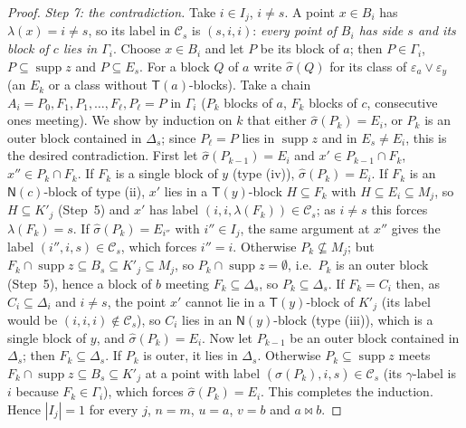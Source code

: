 \documentclass[11pt]{amsart}
\theoremstyle{definition}
\newcommand{\supp}{\operatorname{supp}}
\newcommand{\T}{\mathsf{T}}
\newcommand{\N}{\mathsf{N}}
\newcommand{\mt}{\bowtie}   %
\begin{document}
\begin{proof}
\smallskip\emph{Step 7: the contradiction.} Take $i\in I_j$, $i\ne s$. A point $x\in B_i$ has $\lambda(x)=i\ne s$, so its label in $\mathcal C_s$ is $(s,i,i)$: \emph{every point of $B_i$ has side $s$ and its block of $c$ lies in $\Gamma_i$}. Choose $x\in B_i$ and let $P$ be its block of $a$; then $P\in\Gamma_i$, $P\subseteq\supp z$ and $P\subseteq E_s$. For a block $Q$ of $a$ write $\hat\sigma(Q)$ for its class of $\varepsilon_a\vee\varepsilon_y$ (an $E_k$ or a class without $\T(a)$-blocks). Take a chain $A_i=P_0,F_1,P_1,\dots,F_\ell,P_\ell=P$ in $\Gamma_i$ ($P_k$ blocks of $a$, $F_k$ blocks of $c$, consecutive ones meeting). We show by induction on $k$ that either $\hat\sigma(P_k)=E_i$, or $P_k$ is an outer block contained in $\Delta_s$; since $P_\ell=P$ lies in $\supp z$ and in $E_s\ne E_i$, this is the desired contradiction. First let $\hat\sigma(P_{k-1})=E_i$ and $x'\in P_{k-1}\cap F_k$, $x''\in P_k\cap F_k$. If $F_k$ is a single block of $y$ (type (iv)), $\hat\sigma(P_k)=E_i$. If $F_k$ is an $\N(c)$-block of type (ii), $x'$ lies in a $\T(y)$-block $H\subseteq F_k$ with $H\subseteq E_i\subseteq M_j$, so $H\subseteq K'_j$ (Step~5) and $x'$ has label $(i,i,\lambda(F_k))\in\mathcal C_s$; as $i\ne s$ this forces $\lambda(F_k)=s$. If $\hat\sigma(P_k)=E_{i''}$ with $i''\in I_j$, the same argument at $x''$ gives the label $(i'',i,s)\in\mathcal C_s$, which forces $i''=i$. Otherwise $P_k\not\subseteq M_j$; but $F_k\cap\supp z\subseteq B_s\subseteq K'_j\subseteq M_j$, so $P_k\cap\supp z=\emptyset$, i.e.\ $P_k$ is an outer block (Step~5), hence a block of $b$ meeting $F_k\subseteq\Delta_s$, so $P_k\subseteq\Delta_s$. If $F_k=C_i$ then, as $C_i\subseteq\Delta_i$ and $i\ne s$, the point $x'$ cannot lie in a $\T(y)$-block of $K'_j$ (its label would be $(i,i,i)\notin\mathcal C_s$), so $C_i$ lies in an $\N(y)$-block (type (iii)), which is a single block of $y$, and $\hat\sigma(P_k)=E_i$. Now let $P_{k-1}$ be an outer block contained in $\Delta_s$; then $F_k\subseteq\Delta_s$. If $P_k$ is outer, it lies in $\Delta_s$. Otherwise $P_k\subseteq\supp z$ meets $F_k\cap\supp z\subseteq B_s\subseteq K'_j$ at a point with label $(\hat\sigma(P_k),i,s)\in\mathcal C_s$ (its $\gamma$-label is $i$ because $F_k\in\Gamma_i$), which forces $\hat\sigma(P_k)=E_i$. This completes the induction. Hence $|I_j|=1$ for every $j$, $n=m$, $u=a$, $v=b$ and $a\mt b$.
\end{proof}
\end{document}
